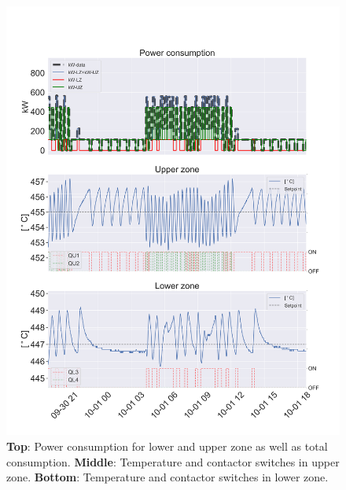\documentclass[lettersize,journal]{IEEEtran}
\begin{document}
\begin{figure}[!t]
    \centering
    \includegraphics[width=\columnwidth]{figures/data_visualization.png}
    \caption{\textbf{Top}: Power consumption for lower and upper zone as well as total consumption. \textbf{Middle}: Temperature and contactor switches in upper zone. \textbf{Bottom}: Temperature and contactor switches in lower zone.}
    \label{fig:data_visualization}
\end{figure}
\end{document}
